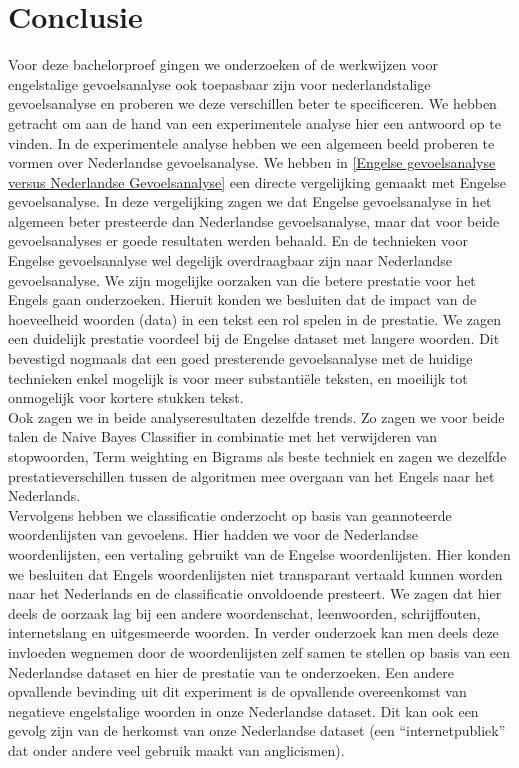\chapter{Conclusie}\label{Conclusie}

Voor deze bachelorproef gingen we onderzoeken of de werkwijzen voor engelstalige gevoelsanalyse ook toepasbaar zijn voor nederlandstalige gevoelsanalyse en proberen we deze verschillen beter te specificeren. We hebben getracht om aan de hand van een experimentele analyse hier een antwoord op te vinden.
In de experimentele analyse hebben we een algemeen beeld proberen te vormen over Nederlandse gevoelsanalyse. We hebben in \ref{Engelse gevoelsanalyse versus Nederlandse Gevoelsanalyse} een directe vergelijking gemaakt met Engelse gevoelsanalyse. In deze vergelijking zagen we dat Engelse gevoelsanalyse in het algemeen beter presteerde dan Nederlandse gevoelsanalyse, maar dat voor beide gevoelsanalyses er goede resultaten werden behaald. En de technieken voor Engelse gevoelsanalyse wel degelijk overdraagbaar zijn naar Nederlandse gevoelsanalyse. We zijn mogelijke oorzaken van die betere prestatie voor het Engels gaan onderzoeken. Hieruit konden we besluiten dat de impact van de hoeveelheid woorden (data) in een tekst een rol spelen in de prestatie. We zagen een duidelijk prestatie voordeel bij de Engelse dataset met langere woorden. Dit bevestigd nogmaals dat een goed presterende gevoelsanalyse met de huidige technieken enkel mogelijk is voor meer substanti\"ele teksten, en moeilijk tot onmogelijk voor kortere stukken tekst.\\
Ook zagen we in beide analyseresultaten dezelfde trends. Zo zagen we voor beide talen de Naive Bayes Classifier in combinatie met het verwijderen van stopwoorden, Term weighting en Bigrams als beste techniek en zagen we dezelfde prestatieverschillen tussen de algoritmen mee overgaan van het Engels naar het Nederlands.\\

Vervolgens hebben we classificatie onderzocht op basis van geannoteerde woordenlijsten van gevoelens. Hier hadden we voor de Nederlandse woordenlijsten, een vertaling gebruikt van de Engelse woordenlijsten. Hier konden we besluiten dat Engels woordenlijsten niet transparant vertaald kunnen worden naar het Nederlands en de classificatie onvoldoende presteert. We zagen dat hier deels de oorzaak lag bij een andere woordenschat, leenwoorden, schrijffouten, internetslang en uitgesmeerde woorden. In verder onderzoek kan men deels deze invloeden wegnemen door de woordenlijsten zelf samen te stellen op basis van een Nederlandse dataset en hier de prestatie van te onderzoeken. Een andere opvallende bevinding uit dit experiment is de opvallende overeenkomst van negatieve engelstalige woorden in onze Nederlandse dataset. Dit kan ook een gevolg zijn van de herkomst van onze Nederlandse dataset (een ``internetpubliek'' dat onder andere veel gebruik maakt van anglicismen).\\

